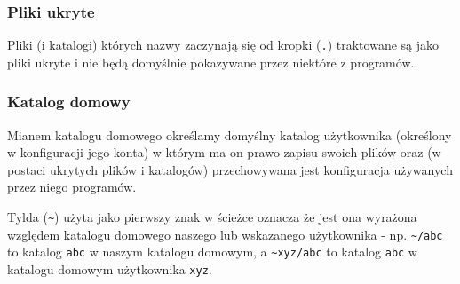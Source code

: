 \subsubsection{Pliki ukryte}

Pliki (i katalogi) których nazwy zaczynają się od kropki (\Verb$.$) traktowane są jako pliki ukryte i nie będą domyślnie pokazywane przez niektóre z programów.

\subsubsection{Katalog domowy}

Mianem katalogu domowego określamy domyślny katalog użytkownika (określony w konfiguracji jego konta) w którym ma on prawo zapisu swoich plików oraz (w postaci ukrytych plików i katalogów) przechowywana jest konfiguracja używanych przez niego programów.

Tylda (\Verb$~$) użyta jako pierwszy znak w ścieżce oznacza że jest ona wyrażona względem katalogu domowego naszego lub wskazanego użytkownika - np. \Verb$~/abc$ to katalog \Verb$abc$ w naszym katalogu domowym, a \Verb$~xyz/abc$ to katalog \Verb$abc$ w katalogu domowym użytkownika \Verb$xyz$.
